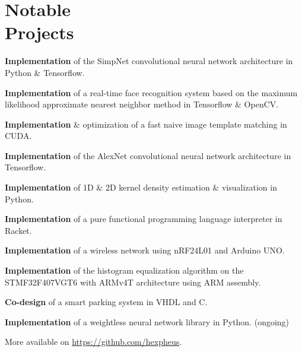 \section{\sc Notable \\ Projects}
	\textbf{Implementation} of the SimpNet convolutional neural network architecture in Python \& Tensorflow.
	
	\textbf{Implementation} of a real-time face recognition system based on the maximum likelihood approximate nearest neighbor method in Tensorflow \& OpenCV.
	
	\textbf{Implementation} \& optimization of a fast naive image template matching in CUDA.
	
	\textbf{Implementation} of the AlexNet convolutional neural network architecture in Tensorflow.
	
	\textbf{Implementation} of 1D \& 2D kernel density estimation \& visualization in Python.
	
	\textbf{Implementation} of a pure functional programming language interpreter in Racket.
	
	\textbf{Implementation} of a wireless network using nRF24L01 and Arduino UNO.
	
	\textbf{Implementation} of the histogram equalization algorithm on the STMF32F407VGT6 with ARMv4T architecture using ARM assembly.
	
	\textbf{Co-design} of a smart parking system in VHDL and C.
	
	\textbf{Implementation} of a weightless neural network library in Python. (ongoing)

More available on \url{https://github.com/hexpheus}.
	

	
\endinput